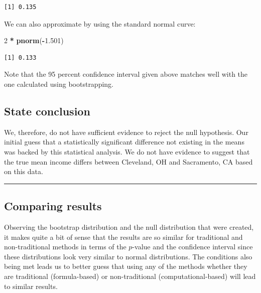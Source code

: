 \documentclass[12pt, krantz2,]{krantz}
\makeatletter
\newenvironment{Shaded}{\begin{snugshade}}{\end{snugshade}}
\newcommand{\DecValTok}[1]{\textcolor[rgb]{0.06,0.06,0.06}{#1}}
\newcommand{\FloatTok}[1]{\textcolor[rgb]{0.06,0.06,0.06}{#1}}
\newcommand{\KeywordTok}[1]{\textcolor[rgb]{0.27,0.27,0.27}{\textbf{#1}}}
\newcommand{\NormalTok}[1]{#1}
\newcommand{\OperatorTok}[1]{\textcolor[rgb]{0.43,0.43,0.43}{\textbf{#1}}}
\newcommand{\StringTok}[1]{\textcolor[rgb]{0.5,0.5,0.5}{#1}}
\newenvironment{kframe}{%
\medskip{}
\setlength{\fboxsep}{.8em}
 \def\at@end@of@kframe{}%
 \ifinner\ifhmode%
  \def\at@end@of@kframe{\end{minipage}}%
  \begin{minipage}{\columnwidth}%
 \fi\fi%
 \def\FrameCommand##1{\hskip\@totalleftmargin \hskip-\fboxsep
 \colorbox{shadecolor}{##1}\hskip-\fboxsep
     \hskip-\linewidth \hskip-\@totalleftmargin \hskip\columnwidth}%
 \MakeFramed {\advance\hsize-\width
   \@totalleftmargin\z@ \linewidth\hsize
   \@setminipage}}%
 {\par\unskip\endMakeFramed%
 \at@end@of@kframe}
\renewenvironment{Shaded}{\begin{kframe}}{\end{kframe}}
\makeatother
\begin{document}
\begin{verbatim}
[1] 0.135
\end{verbatim}

We can also approximate by using the standard normal curve:

\begin{Shaded}
\begin{Highlighting}[]
\DecValTok{2} \OperatorTok{*}\StringTok{ }\KeywordTok{pnorm}\NormalTok{(}\OperatorTok{-}\FloatTok{1.501}\NormalTok{)}
\end{Highlighting}
\end{Shaded}

\begin{verbatim}
[1] 0.133
\end{verbatim}

Note that the 95 percent confidence interval given above matches well with the one calculated using bootstrapping.

\hypertarget{state-conclusion-3}{%
\subsection{State conclusion}\label{state-conclusion-3}}

We, therefore, do not have sufficient evidence to reject the null hypothesis. Our initial guess that a statistically significant difference not existing in the means was backed by this statistical analysis. We do not have evidence to suggest that the true mean income differs between Cleveland, OH and Sacramento, CA based on this data.

\begin{center}\rule{0.5\linewidth}{\linethickness}\end{center}

\hypertarget{comparing-results-3}{%
\subsection{Comparing results}\label{comparing-results-3}}

Observing the bootstrap distribution and the null distribution that were created, it makes quite a bit of sense that the results are so similar for traditional and non-traditional methods in terms of the \(p\)-value and the confidence interval since these distributions look very similar to normal distributions. The conditions also being met leads us to better guess that using any of the methods whether they are traditional (formula-based) or non-traditional (computational-based) will lead to similar results.
\end{document}

